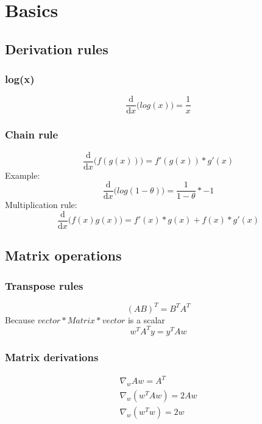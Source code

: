 \section{Basics}
\subsection{Derivation rules}
\subsubsection{log(x)}
\begin{equation}
	\frac{\mathrm{d}}{\mathrm{d} x}\big( log(x) \big) = \frac{1}{x}
\end{equation}
\subsubsection{Chain rule}
\begin{equation}
	\frac{\mathrm{d}}{\mathrm{d} x}\big( f(g(x)) \big) = f'(g(x))*g'(x)
\end{equation}
Example:
\begin{equation}
	\frac{\mathrm{d}}{\mathrm{d} x}\big( log(1-\theta) \big) = \frac{1}{1-\theta}*-
	1
\end{equation}
Multiplication rule:
\begin{equation}
	\frac{\mathrm{d}}{\mathrm{d} x}\big( f(x)g(x) \big) = f'(x)*g(x) + f(x)*g'(x)
\end{equation}
\subsection{Matrix operations}
\subsubsection{Transpose rules}
\begin{equation}
	(AB)^{T}= B^{T}A^{T}
\end{equation}
Because $vector * Matrix * vector$ is a scalar
\begin{equation}
	w^{T}A^{T}y = y^{T}Aw
\end{equation}
\subsubsection{Matrix derivations}
\begin{equation}
	\begin{aligned}
		\nabla_{w}Aw = A^T\\ \nabla_w(w^{T}Aw) = 2Aw\\ \nabla_w(w^{T}w) = 2w\\
	\end{aligned}
\end{equation}